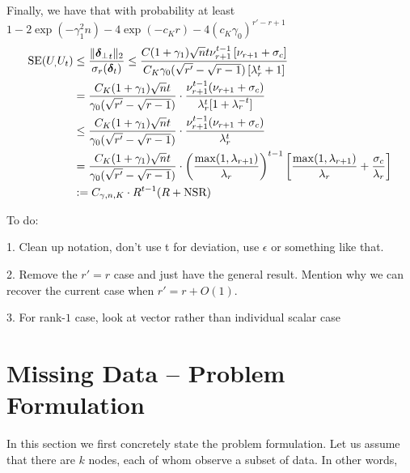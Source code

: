 \documentclass[10pt]{article}
\newcommand{\nsrmax}{\text{NSR}}
\newcommand{\SE}{\mathrm{SE}}
\begin{document}
{Finally, we have that with probability at least $1 - 2 \exp(- \gamma_1^2 n) - 4 \exp(-c_Kr) - 4 (c_K \gamma_0)^{r'-r+1}$  
\begin{align*}
\SE(U_,U_t) &\leq \frac{\|\utsin_t\|_2}{\sigma_r(\utcos_t)} \leq \frac{C (1+ \gamma_1) \sqrt{n} t \nu_{r+1}^{t-1} \left[\nu_{r+1} +  \sigma_c\right]}{C_K \gamma_0(\sqrt{r'} - \sqrt{r-1}) \left[ \lambda_r^t + 1 \right]} \\
&= \frac{C_K (1+ \gamma_1) \sqrt{n} t}{\gamma_0 (\sqrt{r'} - \sqrt{r-1})} \cdot \frac{ \nu_{r+1}^{t-1} (\nu_{r+1} +  \sigma_c )}{\lambda_r^t[ 1 + \lambda_r^{-t}]} \\
&\leq \frac{C_K (1+ \gamma_1) \sqrt{n} t}{\gamma_0 (\sqrt{r'} - \sqrt{r-1})} \cdot \frac{ \nu_{r+1}^{t-1} (\nu_{r+1} +  \sigma_c )}{\lambda_r^t} \\
& = \frac{C_K (1+ \gamma_1) \sqrt{n} t}{\gamma_0 (\sqrt{r'} - \sqrt{r-1})} \cdot \left(\frac{\max(1, \lambda_{r+1})}{\lambda_r}\right)^{t-1} \left[ \frac{\max(1, \lambda_{r+1})}{\lambda_r} + \frac{\sigma_c}{\lambda_r}   \right]  \\
&:= C_{\gamma, n, K} \cdot R^{t-1} (R + \nsrmax)  
\end{align*}

%



}
{\color{red} 
To do:

1. Clean up notation, don't use t for deviation, use $\epsilon$ or something like that. 

2. Remove the $r'=r$ case and just have the general result. Mention why we can recover the current case when $r' = r + O(1)$. 

3. For rank-$1$ case, look at vector rather than individual scalar case


}


\section{Missing Data -- Problem Formulation}
In this section we first concretely state the problem formulation. Let us assume that there are $k$ nodes, each of whom observe a subset of data. In other words, 
\end{document}
